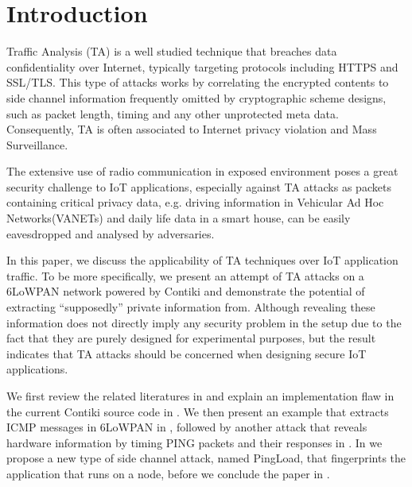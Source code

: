 \section{Introduction}
Traffic Analysis (TA) is a well studied technique that breaches data confidentiality over Internet, typically targeting protocols including HTTPS\cite{rfc2818} and SSL\cite{rfc6101}/TLS\cite{rfc5246}. This type of attacks works by correlating the encrypted contents to side channel information frequently omitted by cryptographic scheme designs, such as packet length, timing and any other unprotected meta data. Consequently, TA is often associated to Internet privacy violation and Mass Surveillance.

The extensive use of radio communication in exposed environment poses a great security challenge to IoT applications, especially against TA attacks as packets containing critical privacy data, e.g. driving information in Vehicular Ad Hoc Networks(VANETs)\cite{VANET} and daily life data in a smart house, can be easily eavesdropped and analysed by adversaries.

In this paper, we discuss the applicability of TA techniques over IoT application traffic. To be more specifically, we present an attempt of TA attacks on a 6LoWPAN\cite{rfc4944} network powered by Contiki\cite{Contiki} and demonstrate the potential of extracting ``supposedly'' private information from. Although revealing these information does not directly imply any security problem in the setup due to the fact that they are purely designed for experimental purposes, but the result indicates that TA attacks should be concerned when designing secure IoT applications.

We first review the related literatures in  and explain an implementation flaw in the current Contiki source code in . We then present an example that extracts ICMP messages in 6LoWPAN in , followed by another attack that reveals hardware information by timing PING packets and their responses in . In  we propose a new type of side channel attack, named PingLoad, that fingerprints the application that runs on a node, before we conclude the paper in .

